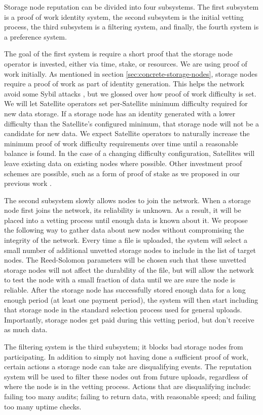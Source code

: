 \documentclass[8pt,fleqn,openany]{book}
\begin{document}
Storage node reputation can be divided into four subsystems.
The first subsystem is a proof of work identity system,
the second subsystem is the initial vetting process,
the third subsystem is a filtering system, and finally,
the fourth system is a preference system.

The goal of the first system is require a short proof that the storage node
operator is invested, either via time, stake, or resources. We are using
proof of work initially.
As mentioned in section \ref{sec:concrete-storage-nodes}, storage nodes require
a proof of work as part of identity generation. This helps the network avoid
some Sybil attacks \cite{sybil-attack}, but we glossed over how proof of work
difficulty is set. We will let Satellite operators set per-Satellite minimum
difficulty required for new data storage. If a storage node has an identity generated
with a lower difficulty than the Satellite's configured minimum, that storage
node will not be a candidate for new data.
We expect Satellite operators to naturally increase the minimum proof of work
difficulty requirements over time until a reasonable balance is found.
In the case of a changing difficulty configuration, Satellites will leave
existing data on existing nodes where possible.
Other investment proof schemes are possible, such as a form of proof of stake as
we proposed in our previous work \cite{sybil-cost}.

The second subsystem slowly allows nodes to join the network.
When a storage node first joins the network, its reliability is unknown.
As a result, it will be placed into a vetting
process until enough data is known about it.
We propose the following way to gather data about new nodes
without compromising the integrity of the network.
Every time a file is uploaded, the system will select a small number of
additional unvetted storage nodes to include in the list of target nodes.
The Reed-Solomon parameters will be chosen such that these unvetted storage
nodes will not affect the durability of the file, but will allow the network
to test the node
with a small fraction of data until we are sure the node is reliable.
After the storage node has successfully stored enough data for a long enough
period (at least one payment period),
the system will then start including that storage
node in the standard selection process used for general uploads.
Importantly, storage nodes get paid during this
vetting period, but don't receive as much data.

The filtering system is the third subsystem; it blocks bad storage nodes from
participating.
In addition to simply not having done a sufficient proof of work,
certain actions a storage node can take are disqualifying events. The
reputation system will be used to filter these nodes out from future uploads,
regardless of where the node is in the vetting process.
Actions that are disqualifying include: failing too many audits;
failing to return data, with reasonable speed; and failing too many uptime
checks.
\end{document}
